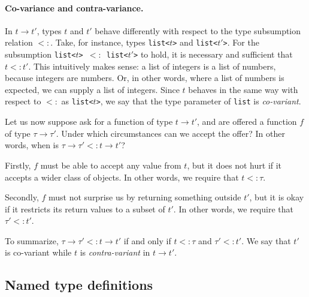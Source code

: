 \documentclass[droidmono,libertine,twoside,user,unofficial]{ecarticle}
\begin{document}
\paragraph{Co-variance and contra-variance.}

In $t\to t'$, types $t$ and $t'$ behave differently with
respect to the type subsumption relation $<:$.
%
Take, for instance, types \texttt{list<$t$>} and \texttt{list<$t'$>}.
For the subsumption \texttt{list<$t$>\,$<:$\,list<$t'$>} to hold, it is
necessary and sufficient that $t<:t'$.  This intuitively makes sense:
a list of integers is a list of numbers, because integers are numbers.
Or, in other words, where a list of numbers is expected, we can supply
a list of integers.  Since $t$ behaves in the same way with respect to
$<:$ as \texttt{list<$t$>}, we say that the type parameter of
\texttt{list} is \emph{co-variant}.

Let us now suppose ask for a function of type $t\to t'$, and are
offered a function $f$ of type $\tau\to\tau'$.  Under which
circumstances can we accept the offer?  In other words, when is
$\tau\to\tau'<:t\to t'$?
\begin{compactitem}
\item Firstly, $f$ must be able to accept any value from $t$, but it
  does not hurt if it accepts a wider class of objects.  In other
  words, we require that $t<:\tau$.
 
\item Secondly, $f$ must not surprise us by returning something
  outside $t'$, but it is okay if it restricts its return values to a
  subset of $t'$.  In other words, we require that $\tau'<:t'$.
\end{compactitem}

To summarize, $\tau\to\tau'<:t\to t'$ if and only if $t<:\tau$ and
$\tau'<:t'$.  We say that $t'$ is co-variant while $t$ is
\emph{contra-variant} in $t\to t'$.





\subsection{Named type definitions}
\label{sec:named-type-def}
\end{document}
